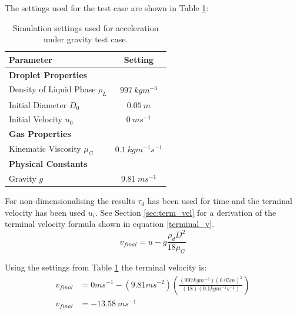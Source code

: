 \documentclass[../Interim_Report_Master]{subfiles}
\begin{document}
The settings used for the test case are shown in Table \ref{tab:grav_test_set}:
\begin{table}[h]
	\centering
	\begin{tabular}{|l c|}
		\hline
		\textbf{Parameter} & \textbf{Setting} \\ \hline
		\textbf{Droplet Properties} &  \\ 
		Density of Liquid Phase $\rho_L$ & $997~kgm^{-3}$ \\
		Initial Diameter ${D_0}$ & $0.05~m$ \\ 
		Initial Velocity $u_0$ & $0~ms^{-1}$ \\ \hline 
		\textbf{Gas Properties} &  \\ 
		Kinematic Viscosity $\mu_G$ & $0.1~kgm^{-1}s^{-1}$ \\ \hline
		\textbf{Physical Constants} &  \\ 
		Gravity $g$ & $9.81~ms^{-1}$ \\ \hline
	\end{tabular}
	\caption{Simulation settings used for acceleration under gravity test case.}
	\label{tab:grav_test_set}
\end{table}

For non-dimensionalising the results $\tau_d$ has been used for time and the terminal velocity has been used $u_i$. See Section \ref{sec:term_vel} for a derivation of the terminal velocity formula shown in equation \ref{terminal_v}.
\begin{equation}
v_{final} = u - g\frac{\rho_d D^2}{18\mu_G}
\label{terminal_v}
\end{equation}

Using the settings from Table \ref{tab:grav_test_set} the terminal velocity is:
\begin{subequations}
\begin{align}
v_{final} &= 0ms^{-1} - (9.81ms^{-2})\left(\frac{(997kgm^{-3})(0.05m)^2}{(18)(0.1kgm^{-1}s^{-1})}\right) \\
v_{final} &= -13.58~ms^{-1}
\end{align}
\end{subequations}
\end{document}

